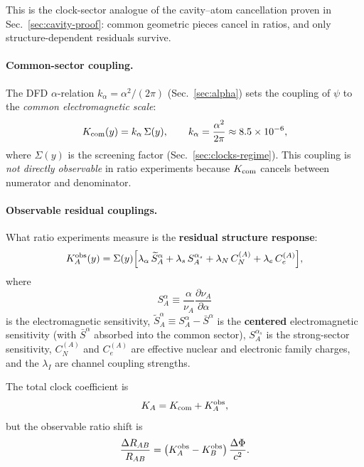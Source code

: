 This is the clock-sector analogue of the cavity--atom cancellation proven in Sec.~\ref{sec:cavity-proof}: common geometric pieces cancel in ratios, and only structure-dependent residuals survive.

\paragraph{Common-sector coupling.}
The DFD $\alpha$-relation $k_\alpha = \alpha^2/(2\pi)$ (Sec.~\ref{sec:alpha}) sets the coupling of $\psi$ to the \emph{common electromagnetic scale}:
\begin{equation}\label{eq:K-com}
K_{\rm com}(y) = k_\alpha\,\Sigma(y), \qquad k_\alpha = \frac{\alpha^2}{2\pi} \approx 8.5 \times 10^{-6},
\end{equation}
where $\Sigma(y)$ is the screening factor (Sec.~\ref{sec:clocks-regime}).  This coupling is \emph{not directly observable} in ratio experiments because $K_{\rm com}$ cancels between numerator and denominator.

\paragraph{Observable residual couplings.}
What ratio experiments measure is the \textbf{residual structure response}:
\begin{equation}\label{eq:K-obs}
K_A^{\rm obs}(y) = \Sigma(y)\Big[\lambda_\alpha\,\widetilde{S}_A^\alpha + \lambda_s\,S_A^{\alpha_s} + \lambda_N\,C_N^{(A)} + \lambda_e\,C_e^{(A)}\Big],
\end{equation}
where
\begin{equation}\label{eq:SA-def}
S_A^\alpha \equiv \frac{\alpha}{\nu_A}\frac{\partial\nu_A}{\partial\alpha}
\end{equation}
is the electromagnetic sensitivity, $\widetilde{S}_A^\alpha \equiv S_A^\alpha - \bar{S}^\alpha$ is the \textbf{centered} electromagnetic sensitivity (with $\bar{S}^\alpha$ absorbed into the common sector), $S_A^{\alpha_s}$ is the strong-sector sensitivity, $C_N^{(A)}$ and $C_e^{(A)}$ are effective nuclear and electronic family charges, and the $\lambda_I$ are channel coupling strengths.

The total clock coefficient is
\begin{equation}\label{eq:K-general}
K_A = K_{\rm com} + K_A^{\rm obs},
\end{equation}
but the observable ratio shift is
\begin{equation}\label{eq:ratio-obs}
\frac{\Delta R_{AB}}{R_{AB}} = \big(K_A^{\rm obs} - K_B^{\rm obs}\big)\,\frac{\Delta\Phi}{c^2}.
\end{equation}

